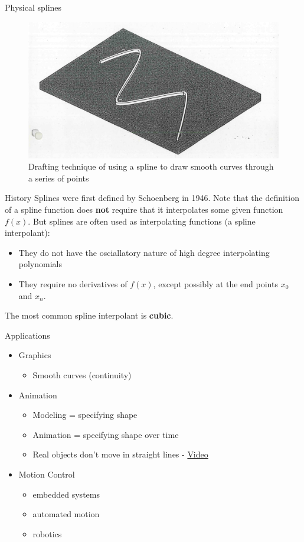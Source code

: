 \documentclass[12pt]{beamer}
\begin{document}
\begin{frame}{Physical splines} 
\begin{figure} 
  \centering
  \includegraphics[scale=0.3]{physical_splines}
  \caption{Drafting technique of using a spline to draw smooth curves 
through a series of points}
  \label{fig:draft}
\end{figure}
\end{frame} 


\begin{frame}{History}
Splines were first defined by Schoenberg in 1946. Note that the definition of a spline function does {\bf not} require that it interpolates some given function $f(x)$. But splines are often used as interpolating functions (a spline interpolant): 
\begin{itemize} 
\item They do not have the osciallatory nature of high degree interpolating polynomials 
\item They require no derivatives of $f(x)$, except possibly at the end points $x_0$ and $x_n$. 
\end{itemize} 

The most common spline interpolant is {\bf cubic}. 
\end{frame} 

\begin{frame}{Applications}
\begin{itemize}
\item{Graphics} 
\begin{itemize} 
\item Smooth curves (continuity) 
\end{itemize}
\item{Animation}
\begin{itemize} 
\item Modeling = specifying shape 
\item Animation = specifying shape over time 
\item Real objects don't move in straight lines - \href{https://www.youtube.com/watch?v=gGbXldn522A}{Video}
\end{itemize}
\item{Motion Control}
\begin{itemize}
\item{embedded systems}
\item{automated motion}
\item{robotics}
\end{itemize}
\end{itemize} 
\end{frame} 
\end{document}
